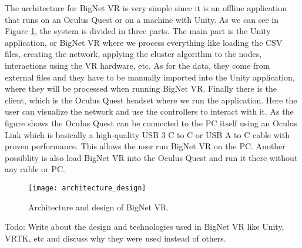 The architecture for BigNet VR is very simple since it is an offline application that runs on an Oculus Quest or on a machine with Unity. As we can see in Figure \ref{fig:architecture_design}, the system is divided in three parts. The main part is the Unity application, or BigNet VR where we process everything like loading the CSV files, creating the network, applying the cluster algorithm to the nodes, interactions using the VR hardware, etc. As for the data, they come from external files and they have to be manually imported into the Unity application, where they will be processed when running BigNet VR. Finally there is the client, which is the Oculus Quest headset where we run the application. Here the user can visualize the network and use the controllers to interact with it. As the figure shows the Oculus Quest can be connected to the PC itself using an Oculus Link which is basically a high-quality USB 3 C to C or USB A to C cable with proven performance\cite{oculus_link}. This allows the user run BigNet VR on the PC. Another possiblity is also load BigNet VR into the Oculus Quest and run it there without any cable or PC.

\begin{figure}[h!]
    \centering%
    \texttt{[image: architecture\_design]}
    \caption{Architecture and design of BigNet VR.}
    \label{fig:architecture_design}
\end{figure}%

Todo: Write about the design and technologies used in BigNet VR like Unity, VRTK, etc and discuss why they were used instead of others.
